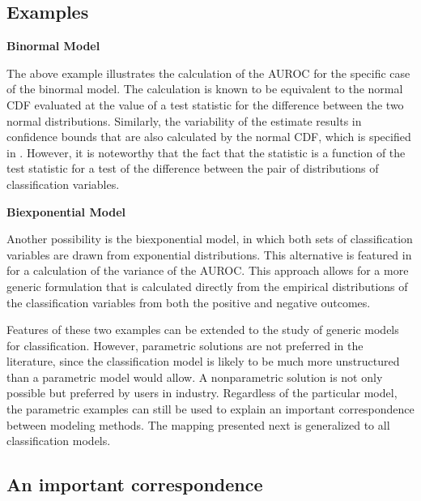 
% 




\subsection{Examples}

\textbf{Binormal Model}

The above example illustrates the calculation of the AUROC for the specific case of the binormal model. 
The calculation is known to be equivalent to the normal CDF evaluated at the value of a test statistic for the difference between the two normal distributions. 
Similarly, the variability of the estimate results in confidence bounds that are also calculated by the normal CDF, which is specified in \citet{demidenko2012}. 
However, it is noteworthy that the fact that the statistic is a function of the test statistic for a test of the difference between the pair of distributions of classification variables. 
% 

\textbf{Biexponential Model}

Another possibility is the biexponential model, in which both sets of classification variables are drawn from exponential distributions. 
% 
This alternative is featured in \citet{hanleymcneil1982} for a calculation of the variance of the AUROC.
This approach allows for a more generic formulation that is calculated directly from the empirical distributions of the classification variables from both the positive and negative outcomes.
% 

Features of these two examples can be extended to the study of generic models for classification. 
However, parametric solutions are not preferred in the literature, since the classification model is likely to be much more unstructured than a parametric model would allow.
A nonparametric solution is not only possible but preferred by users in industry. 
Regardless of the particular model, the parametric examples can still be used to explain an important correspondence between modeling methods. 
The mapping presented next is generalized to all classification models. 

\subsection{An important correspondence}

